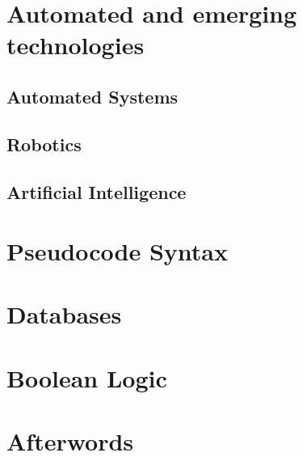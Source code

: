 \documentclass[8pt]{article}
\theoremstyle{remark}
\begin{document}
    \section{Automated and emerging technologies}

        \subsection{Automated Systems}

        \subsection{Robotics}

        \subsection{Artificial Intelligence}

    \section{Pseudocode Syntax}

    \section{Databases}

    \section{Boolean Logic}

    \section*{Afterwords}
        
\end{document}
